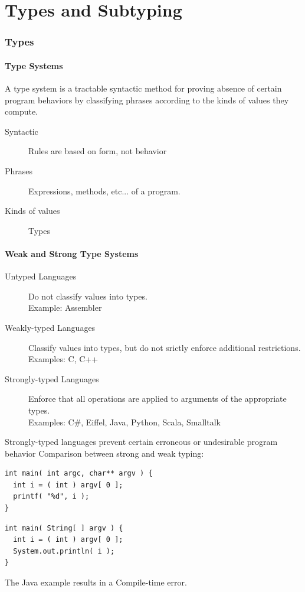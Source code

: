 \part{Types and Subtyping}

\section{Types}

\subsection{Type Systems}
\begin{definition}
 A type system is a tractable syntactic method for
proving absence of certain program behaviors by
classifying phrases according to the kinds of values
they compute.
\end{definition}
\begin{description}
 \item[Syntactic] Rules are based on form, not behavior
 \item[Phrases] Expressions, methods, etc... of a program. 
 \item[Kinds of values] Types
\end{description}

\subsection{Weak and Strong Type Systems}
\begin{description}
 \item[Untyped Languages] Do not classify values into types.\\
  Example: Assembler
 \item[Weakly-typed Languages] Classify values into types, but do not srictly enforce additional restrictions.\\
  Examples: C, C++
 \item[Strongly-typed Languages] Enforce that all operations are applied to arguments of the appropriate types.\\
  Examples: C\#, Eiffel, Java, Python, Scala, Smalltalk
\end{description}

Strongly-typed languages prevent certain
erroneous or undesirable program behavior
Comparison between strong and weak typing:
\lstset{language=C}
\begin{lstlisting}[caption=C Example]
int main( int argc, char** argv ) { 
  int i = ( int ) argv[ 0 ]; 
  printf( "%d", i ); 
} 
\end{lstlisting}
\lstset{language=Java}
\begin{lstlisting}[caption=Java Example]
int main( String[ ] argv ) {
  int i = ( int ) argv[ 0 ];
  System.out.println( i );
}
\end{lstlisting}
The Java example results in a Compile-time error.

